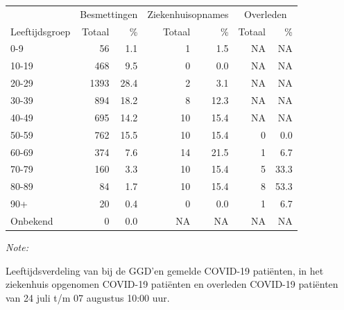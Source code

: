 \documentclass[
  english,
  man,floatsintext]{apa6}
\begin{document}
\begin{table}[H]
\centering\begingroup\fontsize{11}{13}\selectfont

\begin{threeparttable}
\begin{tabular}{lrrrrrr}
\toprule
\multicolumn{1}{c}{ } & \multicolumn{2}{c}{Besmettingen} & \multicolumn{2}{c}{Ziekenhuisopnames} & \multicolumn{2}{c}{Overleden} \\
\cmidrule(l{3pt}r{3pt}){2-3} \cmidrule(l{3pt}r{3pt}){4-5} \cmidrule(l{3pt}r{3pt}){6-7}
Leeftijdsgroep & Totaal & \% & Totaal & \% & Totaal & \%\\
\midrule
0-9 & 56 & 1.1 & 1 & 1.5 & NA & NA\\
10-19 & 468 & 9.5 & 0 & 0.0 & NA & NA\\
20-29 & 1393 & 28.4 & 2 & 3.1 & NA & NA\\
30-39 & 894 & 18.2 & 8 & 12.3 & NA & NA\\
40-49 & 695 & 14.2 & 10 & 15.4 & NA & NA\\
50-59 & 762 & 15.5 & 10 & 15.4 & 0 & 0.0\\
60-69 & 374 & 7.6 & 14 & 21.5 & 1 & 6.7\\
70-79 & 160 & 3.3 & 10 & 15.4 & 5 & 33.3\\
80-89 & 84 & 1.7 & 10 & 15.4 & 8 & 53.3\\
90+ & 20 & 0.4 & 0 & 0.0 & 1 & 6.7\\
Onbekend & 0 & 0.0 & NA & NA & NA & NA\\
\bottomrule
\end{tabular}
\begin{tablenotes}
\item \textit{Note: } 
\item Leeftijdsverdeling van bij de GGD’en gemelde COVID-19 patiënten, in het ziekenhuis opgenomen COVID-19 patiënten en overleden COVID-19 patiënten van 24 juli t/m 07 augustus 10:00 uur.
\end{tablenotes}
\end{threeparttable}
\endgroup{}
\end{table}
\end{document}
